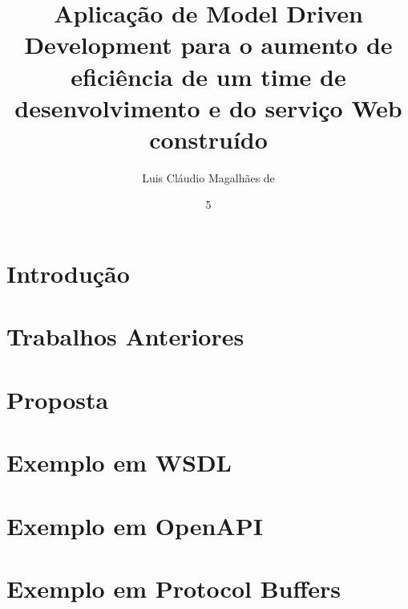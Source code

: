 \documentclass[tg]{ita}    %
\author{Luis Cláudio Magalhães de}{Holanda}
\title{Aplicação de Model Driven Development para o aumento de eficiência de um time de desenvolvimento e do serviço Web construído}
\date{5}{março}{2021}
\begin{document}


\mainmatter

\chapter{Introdução}


\chapter{Trabalhos Anteriores}\label{cap:past-works}


\chapter{Proposta}\label{cap:proposal}


\renewcommand\bibname{\itareferencesnamebabel} %


\annex
\chapter{Exemplo em WSDL}\label{anex:wsdl-example}


\chapter{Exemplo em OpenAPI}\label{anex:openapi-example}


\chapter{Exemplo em Protocol Buffers}\label{anex:protobuf-example}



\FRDitaresumo{}
\end{document}
